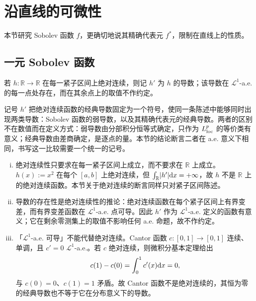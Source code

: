﻿\documentclass[../../main.tex]{subfiles}%
\begin{document}
\section{沿直线的可微性}\label{section:ch04-09}

本节研究 Sobolev 函数 $f$，更确切地说其精确代表元 $f^{*}$，限制在直线上的性质。

\subsection{一元 Sobolev 函数}\label{subsection:ch04-09-1}

\begin{definition*}[绝对连续函数的导数记号]
\label{definition:ch04-def-4-20-导数}
若 $h:\mathbb{R}\to\mathbb{R}$ 在每一紧子区间上绝对连续，则记 $h'$ 为 $h$ 的导数；该导数在 $\mathcal{L}^{1}$-a.e. 的每一点处存在，而在其余点上的取值不作约定。
\end{definition*}

\begin{remark}\label{remark:ch04-def-4-20-导数-动机}
记号 $h'$ 把绝对连续函数的经典导数固定为一个符号，使同一条陈述中能够同时出现两类导数：Sobolev 函数的弱导数，以及其精确代表元的经典导数。两者的区别不在数值而在定义方式：弱导数由分部积分恒等式确定，只作为 $L^{p}_{\mathrm{loc}}$ 的等价类有意义；经典导数由差商确定，是逐点的量。本节的结论断言二者在 a.e. 意义下相同，书写这一比较需要一个统一的记号。
\end{remark}

\begin{remark}\label{remark:ch04-def-4-20-导数-条件}
\begin{enumerate}[(i)]
\item 绝对连续性只要求在每一紧子区间上成立，而不要求在 $\mathbb{R}$ 上成立。$h(x):=x^{2}$ 在每个 $[a,b]$ 上绝对连续，但 $\int_{\mathbb{R}}\lvert h'\rvert\mathrm{d} x=+\infty$，故 $h$ 不是 $\mathbb{R}$ 上的绝对连续函数。本节关于绝对连续的断言同样只对紧子区间陈述。
\item 导数的存在性是绝对连续性的推论：绝对连续函数在每个紧子区间上有界变差，而有界变差函数在 $\mathcal{L}^{1}$-a.e. 点可导。因此 $h'$ 作为 $\mathcal{L}^{1}$-a.e. 定义的函数有意义；它在剩余零测集上的取值不影响任何 a.e. 命题，故不作约定。
\item 「$\mathcal{L}^{1}$-a.e. 可导」不能代替绝对连续。Cantor 函数 $c:[0,1]\to[0,1]$ 连续、单调，且 $c'=0$ $\mathcal{L}^{1}$-a.e.。若 $c$ 绝对连续，则微积分基本定理给出
\begin{align*}
c(1)-c(0)=\int_{0}^{1}c'(x)\mathrm{d} x=0,
\end{align*}
与 $c(0)=0$、$c(1)=1$ 矛盾。故 Cantor 函数不是绝对连续的，其恒为零的经典导数也不等于它在分布意义下的导数。
\end{enumerate}
\end{remark}
\end{document}
